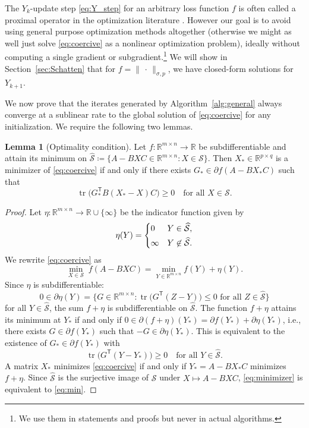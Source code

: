 \documentclass[11pt,reqno]{amsart}
\newcommand{\tp}{{\scriptscriptstyle\mathsf{T}}}
\newcommand{\st}{\sigma}
\DeclareMathOperator{\tr}{tr}
\theoremstyle{definition}
\newtheorem{lemma}[theorem]{Lemma}
\numberwithin{equation}{section}
\newcommand{\R}{\mathbb{R}}
\begin{document}
The $Y_k$-update step \eqref{eq:Y_step} for an arbitrary loss function $f$ is often called a proximal operator in the optimization literature \cite{proximal}. However our goal is to avoid using general purpose optimization methods altogether (otherwise we might as well just solve \eqref{eq:coercive} as a nonlinear optimization problem), ideally without computing a single gradient or subgradient.\footnote{We use them in statements and proofs but never in actual algorithms.} We will show in Section~\ref{sec:Schatten} that for $f = \lVert \, \cdot \, \rVert_{\st,p}$, we have closed-form solutions for $Y_{k+1}$.

We now prove that the iterates generated by Algorithm~\ref{alg:general} always converge at a sublinear rate to the global solution of \eqref{eq:coercive} for any initialization. We require the following two lemmas.
\begin{lemma}[Optimality condition]\label{lem:opt}
Let $f: \R^{m \times n} \to \R$ be subdifferentiable and attain its minimum on $\widehat{\mathcal{S}} \coloneqq \{A - BXC \in \R^{m \times n} : X \in \mathcal{S}\}$. Then $X_* \in \R^{p \times q}$ is a minimizer of \eqref{eq:coercive} if and only if there exists $G_* \in \partial f(A - BX_* C)$ such that
\begin{equation}\label{eq:min}
\tr\bigl(G_*^{\tp}  B(X_* - X)C \bigr) \ge 0 \quad \text{for all } X \in \mathcal{S}.
\end{equation}
\end{lemma}
\begin{proof}
Let $\eta: \R^{m \times n} \to \R \cup \{\infty\}$ be the indicator function given by
\[
\eta(Y) = \begin{dcases}
    0 & Y \in \widehat{\mathcal{S}},\\
    \infty & Y \not\in \widehat{\mathcal{S}}.
\end{dcases}
\]
We rewrite \eqref{eq:coercive} as
\[\min_{X \in \mathcal{S}} \; f(A - BXC) = \min_{Y \in \R^{m \times n}}  f(Y) + \eta(Y).\]
Since $\eta$ is subdifferentiable:
\[
0 \in \partial \eta(Y) = \{G \in \R^{m \times n} : \tr\bigl(G^\tp (Z-Y)\bigr) \le 0 \text{ for all } Z \in \widehat{\mathcal{S}} \}
\]
for all $Y \in \widehat{\mathcal{S}}$, the sum $f + \eta$ is subdifferentiable on $\widehat{\mathcal{S}}$. The function $f + \eta$ attains its minimum at $Y_*$ if and only if $0 \in \partial (f + \eta)(Y_*) = \partial f(Y_*) + \partial \eta(Y_*)$, i.e., there exists $G \in \partial f(Y_*)$ such that $-G \in \partial \eta(Y_*)$. This is equivalent to the existence of $G_* \in \partial f(Y_*)$ with
\begin{equation}\label{eq:minimizer}
    \tr\bigl(G^\tp (Y-Y_*) \bigr)\ge 0 \quad \text{for all } Y \in \widehat{\mathcal{S}}.
\end{equation}
A matrix $X_*$ minimizes \eqref{eq:coercive} if and only if $Y_* = A - BX_*C$ minimizes $f+ \eta$. Since $\widehat{\mathcal{S}}$ is the surjective image of $\mathcal{S}$ under $X \mapsto A-BXC$, \eqref{eq:minimizer} is equivalent to \eqref{eq:min}.
\end{proof}
\end{document}
